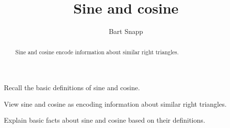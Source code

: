 \documentclass[noauthor,nooutcomes,12pt]{ximera}
\title{Sine and cosine}
\author{Bart Snapp}
\begin{document}
\begin{abstract}
  Sine and cosine encode information about similar right triangles.
\end{abstract}
\maketitle

\begin{listOutcomes}
\item Recall the basic definitions of sine and cosine.
\item View sine and cosine as encoding information about similar right
  triangles.
\item Explain basic facts about sine and cosine based on their
  definitions.
\end{listOutcomes}
\mynewpage
\end{document}
